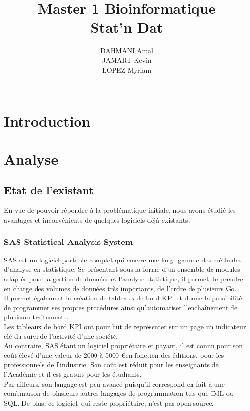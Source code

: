 \documentclass[a4paper,10pt]{report}
\title{Master 1 Bioinformatique\\Stat'n Dat}
\author{DAHMANI Amal\\JAMART Kevin\\LOPEZ Myriam\\\\}
\begin{document}
\renewcommand{\contentsname}{Sommaire}


\maketitle
\newpage
\tableofcontents
{}
\setcounter{tocdepth}{3}     %
\setcounter{secnumdepth}{3}  %


\newpage
\thispagestyle{empty}
\setcounter{page}{1}

\chapter*{Introduction}


 
\chapter{Analyse}

\section{Etat de l'existant}

En vue de pouvoir répondre à la problématique initiale, nous avons étudié les avantages et inconvénients de quelques logiciels déjà existants.

\subsection{SAS-Statistical Analysis System}
SAS est un logiciel portable complet qui couvre une large gamme des méthodes d’analyse en statistique. Se présentant sous la forme d’un ensemble de modules adaptés pour la gestion de données et l’analyse statistique, il permet de prendre en charge des volumes de données très importants, de l’ordre de plusieurs Go. \\
	Il permet également la création de tableaux de bord KPI et donne la possibilité de programmer ses propres procédures ainsi qu’automatiser l’enchaînement de plusieurs traitements. \\
	Les tableaux de bord KPI ont pour but de représenter sur un page un indicateur clé du suivi de l’activité d’une société. \\

Au contraire, SAS étant un logiciel propriétaire et payant, il est connu pour son coût élevé d’une valeur de 2000 à 5000 \euro en fonction des éditions, pour les professionnels de l’industrie. Son coût est réduit pour les enseignants de l’Académie et il est gratuit pour les étudiants.\\
Par ailleurs, son langage est peu avancé puisqu’il correspond en fait à une combinaison de plusieurs autres langages de programmation tels que IML ou SQL.
De plus, ce logiciel, qui reste propriétaire, n'est pas open source.
\\
\end{document}
